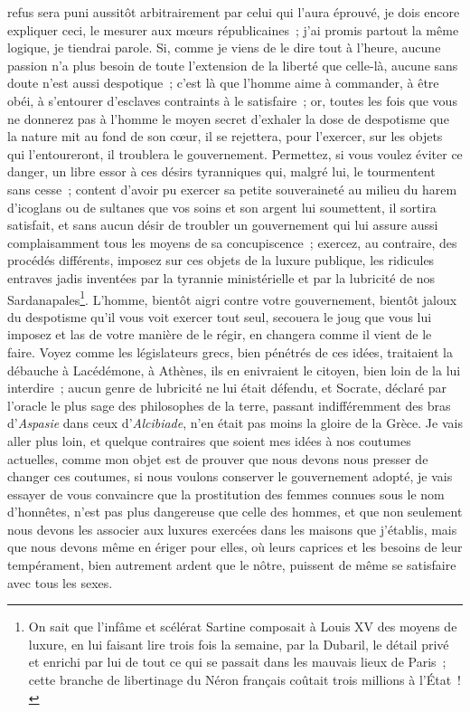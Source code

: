 \documentclass[french,twoside]{book} %
\begin{document}
refus sera puni aussitôt arbitrairement par celui qui l’aura éprouvé, je dois encore expliquer ceci, le mesurer aux mœurs républicaines ; j’ai promis partout la même logique, je tiendrai parole. Si, comme je viens de le dire tout à l’heure, aucune passion n’a plus besoin de toute l’extension de la liberté que celle-là, aucune sans doute n’est aussi despotique ; c’est là que l’homme aime à commander, à être obéi, à s’entourer d’esclaves contraints à le satisfaire ; or, toutes les fois que vous ne donnerez pas à l’homme le moyen secret d’exhaler la dose de despotisme que la nature mit au fond de son cœur, il se rejettera, pour l’exercer, sur les objets qui l’entoureront, il troublera le gouvernement. Permettez, si vous voulez éviter ce danger, un libre essor à ces désirs tyranniques qui, malgré lui, le tourmentent sans cesse ; content d’avoir pu exercer sa petite souveraineté au milieu du harem d’icoglans ou de sultanes que vos soins et son argent lui soumettent, il sortira satisfait, et sans aucun désir de troubler un gouvernement qui lui assure aussi complaisamment tous les moyens de sa concupiscence ; exercez, au contraire, des procédés différents, imposez sur ces objets de la luxure publique, les ridicules entraves jadis inventées par la tyrannie ministérielle et par la lubricité de nos Sardanapales\footnote{ On sait que l’infâme et scélérat Sartine composait à Louis XV des moyens de luxure, en lui faisant lire trois fois la semaine, par la Dubaril, le détail privé et enrichi par lui de tout ce qui se passait dans les mauvais lieux de Paris ; cette branche de libertinage du Néron français coûtait trois millions à l’État !}. L’homme, bientôt aigri contre votre gouvernement, bientôt jaloux du despotisme qu’il vous voit exercer tout seul, secouera le joug que vous lui imposez et las de votre manière de le régir, en changera comme il vient de le faire. Voyez comme les législateurs grecs, bien pénétrés de ces idées, traitaient la débauche à Lacédémone, à Athènes, ils en enivraient le citoyen, bien loin de la lui interdire ; aucun genre de lubricité ne lui était défendu, et Socrate, déclaré par l’oracle le plus sage des philosophes de la terre, passant indifféremment des bras d’{\itshape Aspasie} dans ceux d’{\itshape Alcibiade}, n’en était pas moins la gloire de la Grèce. Je vais aller plus loin, et quelque contraires que soient mes idées à nos coutumes actuelles, comme mon objet est de prouver que nous devons nous presser de changer ces coutumes, si nous voulons conserver le gouvernement adopté, je vais essayer de vous convaincre que la prostitution des femmes connues sous le nom d’honnêtes, n’est pas plus dangereuse que celle des hommes, et que non seulement nous devons les associer aux luxures exercées dans les maisons que j’établis, mais que nous devons même en ériger pour elles, où leurs caprices et les besoins de leur tempérament, bien autrement ardent que le nôtre, puissent de même se satisfaire avec tous les sexes.\par
\end{document}
